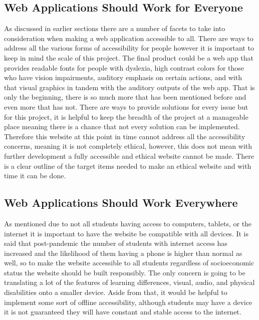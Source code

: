 \documentclass[10pt,twocolumn]{article}
\begin{document}
\subsection{Web Applications Should Work for Everyone}
As discussed in earlier sections there are a number of facets to take into consideration when making a web application accessible to all. There are ways to address all the various forms of accessibility for people however it is important to keep in mind the scale of this project. The final product could be a web app that provides readable fonts for people with dyslexia, high contrast colors for those who have vision impairments, auditory emphasis on certain actions, and with that visual graphics in tandem with the auditory outputs of the web app. That is only the beginning, there is so much more that has been mentioned before and even more that has not. There are ways to provide solutions for every issue but for this project, it is helpful to keep the breadth of the project at a manageable place meaning there is a chance that not every solution can be implemented. Therefore this website at this point in time cannot address all the accessibility concerns, meaning it is not completely ethical, however, this does not mean with further development a fully accessible and ethical website cannot be made. There is a clear outline of the target items needed to make an ethical website and with time it can be done. 

\subsection{Web Applications Should Work Everywhere}

As mentioned due to not all students having access to computers, tablets, or the internet it is important to have the website be compatible with all devices. It is said that post-pandemic the number of students with internet access has increased and the likelihood of them having a phone is higher than normal as well, so to make the website accessible to all students regardless of socioeconomic status the website should be built responsibly. The only concern is going to be translating a  lot of the features of learning differences, visual, audio, and physical disabilities onto a smaller device. Aside from that, it would be helpful to implement some sort of offline accessibility, although students may have a device it is not guaranteed they will have constant and stable access to the internet. 
\end{document}
